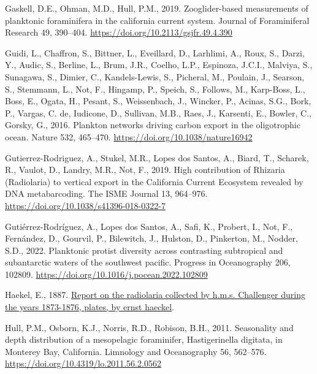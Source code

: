 \documentclass[
  letterpaper,
  DIV=11,
  numbers=noendperiod]{scrartcl}
\newlength{\cslhangindent}
\newlength{\cslentryspacingunit} %
\newenvironment{CSLReferences}[2] %
 {%
  \setlength{\parindent}{0pt}
  \ifodd #1
  \let\oldpar\par
  \def\par{\hangindent=\cslhangindent\oldpar}
  \fi
  \setlength{\parskip}{#2\cslentryspacingunit}
 }%
 {}
\begin{document}
\begin{CSLReferences}{1}{0}
\leavevmode{}%
Gaskell, D.E., Ohman, M.D., Hull, P.M., 2019. Zooglider-based
measurements of planktonic foraminifera in the california current
system. Journal of Foraminiferal Research 49, 390--404.
\url{https://doi.org/10.2113/gsjfr.49.4.390}

\leavevmode{}%
Guidi, L., Chaffron, S., Bittner, L., Eveillard, D., Larhlimi, A., Roux,
S., Darzi, Y., Audic, S., Berline, L., Brum, J.R., Coelho, L.P.,
Espinoza, J.C.I., Malviya, S., Sunagawa, S., Dimier, C., Kandels-Lewis,
S., Picheral, M., Poulain, J., Searson, S., Stemmann, L., Not, F.,
Hingamp, P., Speich, S., Follows, M., Karp-Boss, L., Boss, E., Ogata,
H., Pesant, S., Weissenbach, J., Wincker, P., Acinas, S.G., Bork, P.,
Vargas, C. de, Iudicone, D., Sullivan, M.B., Raes, J., Karsenti, E.,
Bowler, C., Gorsky, G., 2016. Plankton networks driving carbon export in
the oligotrophic ocean. Nature 532, 465--470.
\url{https://doi.org/10.1038/nature16942}

\leavevmode{}%
Gutierrez-Rodriguez, A., Stukel, M.R., Lopes dos Santos, A., Biard, T.,
Scharek, R., Vaulot, D., Landry, M.R., Not, F., 2019. High contribution
of Rhizaria (Radiolaria) to vertical export in the California Current
Ecosystem revealed by DNA metabarcoding. The ISME Journal 13, 964--976.
\url{https://doi.org/10.1038/s41396-018-0322-7}

\leavevmode{}%
Gutiérrez-Rodríguez, A., Lopes dos Santos, A., Safi, K., Probert, I.,
Not, F., Fernández, D., Gourvil, P., Bilewitch, J., Hulston, D.,
Pinkerton, M., Nodder, S.D., 2022. Planktonic protist diversity across
contrasting subtropical and subantarctic waters of the southwest
pacific. Progress in Oceanography 206, 102809.
\url{https://doi.org/10.1016/j.pocean.2022.102809}

\leavevmode{}%
Haekel, E., 1887.
\href{https://www.gutenberg.org/cache/epub/44527/pg44527-images.html}{Report
on the radiolaria collected by h.m.s. Challenger during the years
1873-1876, plates, by ernst haeckel}.

\leavevmode{}%
Hull, P.M., Osborn, K.J., Norris, R.D., Robison, B.H., 2011. Seasonality
and depth distribution of a mesopelagic foraminifer, Hastigerinella
digitata, in Monterey Bay, California. Limnology and Oceanography 56,
562--576. \url{https://doi.org/10.4319/lo.2011.56.2.0562}


\end{CSLReferences}
\end{document}
